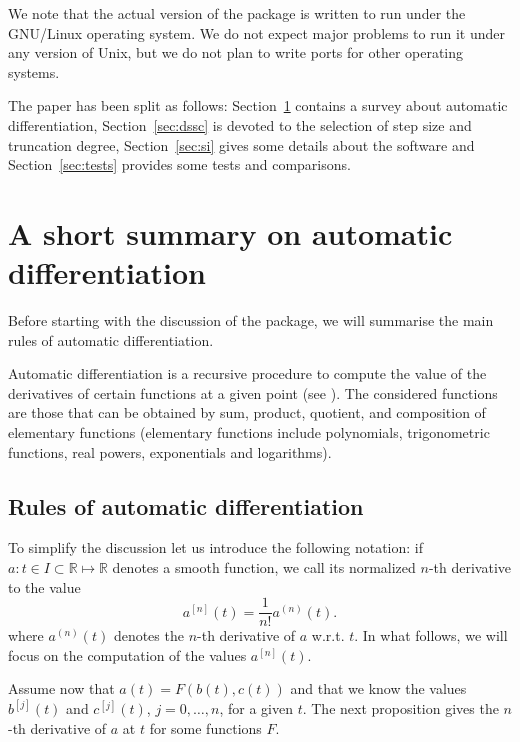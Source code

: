 \documentclass[12pt,twoside]{article}
\newcommand{\RR}{{\mathbb R}}               %
\begin{document}
We note that the actual version of the package is written to run under
the GNU/Linux operating system. We do not expect major problems to run
it under any version of Unix, but we do not plan to write ports for
other operating systems.

The paper has been split as follows: Section~\ref{sec:auto} contains a
survey about automatic differentiation, Section~\ref{sec:dssc} is
devoted to the selection of step size and truncation degree,
Section~\ref{sec:si} gives some details about the software and
Section~\ref{sec:tests} provides some tests and comparisons.


\section{A short summary on automatic differentiation}\label{sec:auto}
Before starting with the discussion of the package, we will summarise
the main rules of automatic differentiation.

Automatic differentiation is a recursive procedure to compute the
value of the derivatives of certain functions at a given point (see
\cite{Moore66,Rall81}). The considered functions are those that can be
obtained by sum, product, quotient, and composition of elementary
functions (elementary functions include polynomials, trigonometric
functions, real powers, exponentials and logarithms).

\subsection{Rules of automatic differentiation}\label{sec:rules}
To simplify the discussion let us introduce the following notation: if
$a:t\in I\subset\RR\mapsto\RR$ denotes a smooth function, we call its
normalized $n$-th derivative to the value
\begin{equation}
a^{[n]}(t)=\frac{1}{n!}a^{(n)}(t).
\label{eq:def[]}
\end{equation}
where $a^{(n)}(t)$ denotes the $n$-th derivative of $a$ w.r.t. $t$.
In what follows, we will focus on the computation of the values
$a^{[n]}(t)$.

Assume now that $a(t)=F(b(t),c(t))$ and that we know the values
$b^{[j]}(t)$ and $c^{[j]}(t)$, $j=0,\ldots,n$, for a given $t$. The
next proposition gives the $n$-th derivative of $a$ at $t$ for some
functions $F$.
\end{document}
